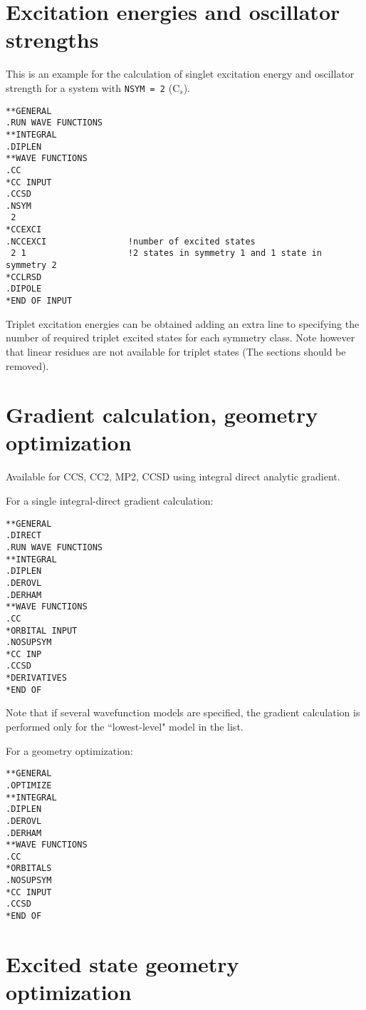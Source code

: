 \section{Excitation energies and oscillator strengths}
This is an example for the calculation of singlet excitation energy and
oscillator strength for a system with \verb+NSYM = 2+ (C$_s$).
\begin{verbatim}
**GENERAL
.RUN WAVE FUNCTIONS
**INTEGRAL
.DIPLEN
**WAVE FUNCTIONS
.CC
*CC INPUT
.CCSD
.NSYM
 2
*CCEXCI
.NCCEXCI                !number of excited states
 2 1                    !2 states in symmetry 1 and 1 state in symmetry 2
*CCLRSD
.DIPOLE
*END OF INPUT
\end{verbatim}
Triplet excitation energies can be obtained adding
an extra line to  specifying the number 
of required triplet excited states for each symmetry class.  
Note however that linear residues are not available
for triplet states (The  sections should be removed).

\section{Gradient calculation, geometry optimization}
Available for CCS, CC2, MP2, CCSD using integral direct analytic gradient.

\noindent For a single integral-direct gradient calculation:
\begin{verbatim}
**GENERAL
.DIRECT
.RUN WAVE FUNCTIONS
**INTEGRAL
.DIPLEN
.DEROVL
.DERHAM
**WAVE FUNCTIONS
.CC
*ORBITAL INPUT
.NOSUPSYM
*CC INP
.CCSD
*DERIVATIVES
*END OF
\end{verbatim}
Note that if several wavefunction models are specified, 
the gradient calculation is performed only for the ``lowest-level" 
model in the list.

\noindent For a geometry optimization:
\begin{verbatim}
**GENERAL
.OPTIMIZE
**INTEGRAL
.DIPLEN
.DEROVL
.DERHAM
**WAVE FUNCTIONS
.CC
*ORBITALS
.NOSUPSYM
*CC INPUT
.CCSD
*END OF
\end{verbatim}

\section{Excited state geometry optimization}

